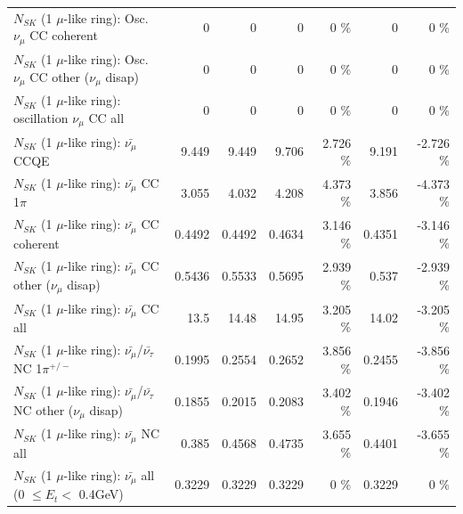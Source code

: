 \begin{table}
\begin{tabular}{| l | r | r | r  r | r  r |}
                        $N_{SK}$ (1 $\mu$-like ring): Osc. $\nu_\mu$ CC coherent &               0 &               0 &               0 &        0 \%  &               0 &        0 \%  \\ 
         $N_{SK}$ (1 $\mu$-like ring): Osc. $\nu_\mu$ CC other ($\nu_\mu$ disap) &               0 &               0 &               0 &        0 \%  &               0 &        0 \%  \\ 
                      $N_{SK}$ (1 $\mu$-like ring): oscillation $\nu_\mu$ CC all &               0 &               0 &               0 &        0 \%  &               0 &        0 \%  \\ 
\hline
\hline
                              $N_{SK}$ (1 $\mu$-like ring): $\bar{\nu_\mu}$ CCQE &           9.449 &           9.449 &           9.706 &    2.726 \%  &           9.191 &   -2.726 \%  \\ 
                         $N_{SK}$ (1 $\mu$-like ring): $\bar{\nu_\mu}$ CC 1$\pi$ &           3.055 &           4.032 &           4.208 &    4.373 \%  &           3.856 &   -4.373 \%  \\ 
                       $N_{SK}$ (1 $\mu$-like ring): $\bar{\nu_\mu}$ CC coherent &          0.4492 &          0.4492 &          0.4634 &    3.146 \%  &          0.4351 &   -3.146 \%  \\ 
        $N_{SK}$ (1 $\mu$-like ring): $\bar{\nu_\mu}$ CC other ($\nu_\mu$ disap) &          0.5436 &          0.5533 &          0.5695 &    2.939 \%  &           0.537 &   -2.939 \%  \\ 
                          $N_{SK}$ (1 $\mu$-like ring): $\bar{\nu_{\mu}}$ CC all &            13.5 &           14.48 &           14.95 &    3.205 \%  &           14.02 &   -3.205 \%  \\ 
\hline
  $N_{SK}$ (1 $\mu$-like ring): $\bar{\nu_\mu}$/$\bar{\nu_\tau}$ NC 1$\pi^{+/-}$ &          0.1995 &          0.2554 &          0.2652 &    3.856 \%  &          0.2455 &   -3.856 \%  \\ 
$N_{SK}$ (1 $\mu$-like ring): $\bar{\nu_\mu}$/$\bar{\nu_\tau}$ NC other ($\nu_\mu$ disap) &          0.1855 &          0.2015 &          0.2083 &    3.402 \%  &          0.1946 &   -3.402 \%  \\ 
                          $N_{SK}$ (1 $\mu$-like ring): $\bar{\nu_{\mu}}$ NC all &           0.385 &          0.4568 &          0.4735 &    3.655 \%  &          0.4401 &   -3.655 \%  \\ 
\hline
   $N_{SK}$ (1 $\mu$-like ring): $\bar{\nu_{\mu}}$ all (0 $\leq E_{t} <$ 0.4GeV) &          0.3229 &          0.3229 &          0.3229 &        0 \%  &          0.3229 &        0 \%  \\ 

\end{tabular}
\end{table}
